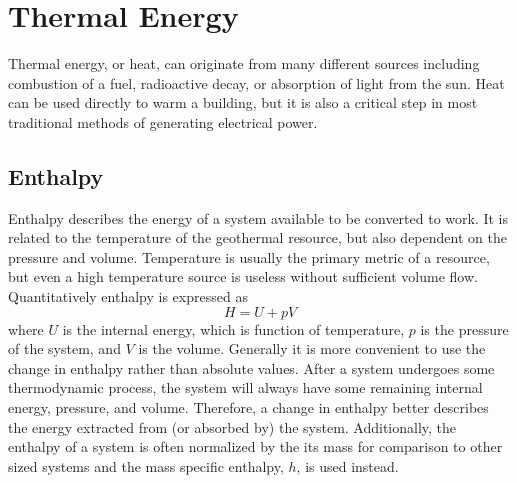 \section{Thermal Energy}
Thermal energy, or heat, can originate from many different sources including combustion of a fuel, radioactive decay, or absorption of light from the sun. Heat can be used directly to warm a building, but it is also a critical step in most traditional methods of generating electrical power. 

\subsection{Enthalpy}
Enthalpy describes the energy of a system available to be converted to work. It is related to the temperature of the geothermal resource, but also dependent on the pressure and volume. Temperature is usually the primary metric of a resource, but even a high temperature source is useless without sufficient volume flow. Quantitatively enthalpy is expressed as \cite{Nellis2009}
\begin{equation}
H = U + pV
\end{equation}
where $U$ is the internal energy, which is function of temperature, $p$ is the pressure of the system, and $V$ is the volume. Generally it is more convenient to use the change in enthalpy rather than absolute values. After a system undergoes some thermodynamic process, the system will always have some remaining internal energy, pressure, and volume. Therefore, a change in enthalpy better describes the energy extracted from (or absorbed by) the system.
Additionally, the enthalpy of a system is often normalized by the its mass for comparison to other sized systems and the mass specific enthalpy, $h$, is used instead.


